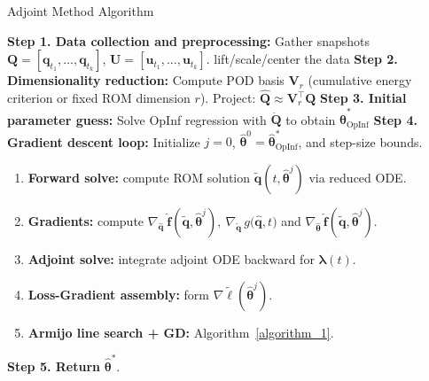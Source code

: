 \begin{frame}{Adjoint Method Algorithm}
    
\begin{center}
\begin{minipage}{0.97\textwidth}
\scriptsize
\LinesNotNumbered
\begin{algorithm}[H]
\caption{Adjoint Method for Parameter Training}\label{algorithm_2}
\SetAlgoNoLine
\textbf{Step 1. Data collection and preprocessing:} Gather snapshots $\mathbf{Q}=[\mathbf{q}_{t_1},\dots,\mathbf{q}_{t_k}]$, $\mathbf{U}=[\mathbf{u}_{t_1},\dots,\mathbf{u}_{t_k}]$.
\quad [Optional] lift/scale/center the data\;
\textbf{Step 2. Dimensionality reduction:} Compute POD basis $\mathbf{V}_r$ (cumulative energy criterion or fixed ROM dimension $r$). Project: $\hat{\mathbf{Q}} \approx \mathbf{V}_r^\top\mathbf{Q}$\;
\textbf{Step 3. Initial parameter guess:} Solve OpInf regression with $\dot{\mathbf{Q}}$ to obtain $\hat{\bm\theta}^{*}_{\text{OpInf}}$\;
\textbf{Step 4. Gradient descent loop:}
Initialize $j=0$, $\hat{\bm\theta}^0=\hat{\bm\theta}^{*}_{\text{OpInf}}$, and step-size bounds.
\begin{enumerate}
  \item \textbf{Forward solve:}
    compute ROM solution $\tilde{\mathbf{q}}(t,\hat{\bm\theta}^j)$ via reduced ODE.
  \item \textbf{Gradients:}
    compute $\nabla_{\hat{\mathbf{q}}}~\hat{\mathbf{f}}(\tilde{\mathbf{q}}, \hat{\bm{\theta}}^j),~\nabla_{\tilde{\mathbf{q}}}\,g\bigl(\hat{\mathbf{q}},t\bigr)$ and $\nabla_{\hat{\bm{\theta}}}\,\hat{\mathbf{f}}(\tilde{\mathbf{q}}, \hat{\bm{\theta}}^j)$.
  \item \textbf{Adjoint solve:}
    integrate adjoint ODE backward for $\bm\lambda(t)$.
  \item \textbf{Loss-Gradient assembly:}
    form $\nabla\tilde\ell(\hat{\bm\theta}^j)$.
  \item \textbf{Armijo line search + GD:} Algorithm~\ref{algorithm_1}.
\end{enumerate}
\textbf{Step 5. Return} {$\hat{\bm\theta}^*$}.
\end{algorithm}
\end{minipage}
\end{center}

\end{frame}